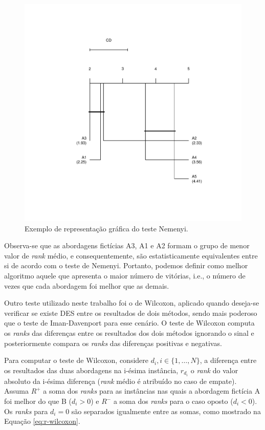 \begin{figure}[!ht] \centering
\includegraphics[scale=0.4]{imagens/exemplo-nemenyi.pdf}
    \caption{Exemplo de representação gráfica do teste Nemenyi.}
    \label{fig:ex-nemenyi}
\end{figure}

Observa-se que as abordagens fictícias A3, A1 e A2 formam o grupo de menor valor
de \textit{rank}  médio, e  consequentemente, são  estatisticamente equivalentes
entre si de acordo com o teste de Nemenyi. Portanto, podemos definir como melhor
algoritmo aquele  que apresenta o  maior número de  vitórias, i.e., o  número de
vezes que cada abordagem foi melhor que as demais.

Outro  teste  utilizado  neste  trabalho  foi o  de  Wilcoxon,  aplicado  quando
deseja-se verificar  se existe DES  entre os  resultados de dois  métodos, sendo
mais  poderoso que  o teste  de  Iman-Davenport para  esse cenário.  O teste  de
Wilcoxon computa os  \textit{ranks} das diferenças entre os  resultados dos dois
métodos  ignorando  o  sinal  e posteriormente  compara  os  \textit{ranks}  das
diferenças positivas e negativas.

Para computar  o teste de  Wilcoxon, considere $d_i, i  \in \{1, \dots,  N\}$, a
diferença  entre  os  resultados  das  duas  abordagens  na  i-ésima  instância,
$r_{d_i}$ o \textit{rank} do valor  absoluto da i-ésima diferença (\textit{rank}
médio é  atribuído no caso  de empate). Assuma  $R^+$ a soma  dos \textit{ranks}
para as instâncias nas quais a abordagem fictícia  A foi melhor do que B ($d_i >
0$) e  $R^{-}$ a  soma dos  \textit{ranks} para o  caso oposto  ($d_i <  0$). Os
\textit{ranks} para  $d_i =  0$ são  separados igualmente  entre as  somas, como
mostrado na Equação \eqref{eq:r-wilcoxon}.

